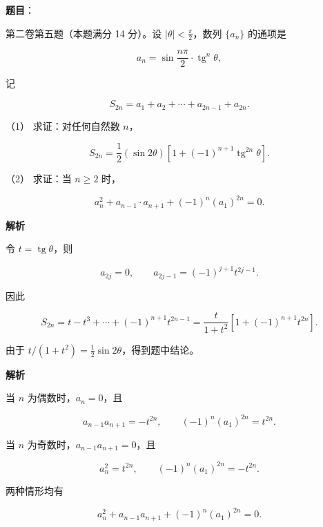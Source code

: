 \begin{answer}

\textbf{题目}：

第二卷第五题（本题满分 14 分）。设 $|\theta|<\frac\pi2$，数列 $\{a_n\}$ 的通项是

\nopagebreak[4]
\[
a_n=\sin\frac{n\pi}{2}\cdot\operatorname{tg}^n\theta,
\]

记

\nopagebreak[4]
\[
S_{2n}=a_1+a_2+\cdots+a_{2n-1}+a_{2n}.
\]

（1） 求证：对任何自然数 $n$，

\nopagebreak[4]
\[
S_{2n}=\frac12(\sin2\theta)
\left[1+(-1)^{n+1}\operatorname{tg}^{2n}\theta\right].
\]

（2） 求证：当 $n\ge2$ 时，

\nopagebreak[4]
\[
a_n^2+a_{n-1}\cdot a_{n+1}+(-1)^n(a_1)^{2n}=0.
\]

\textbf{解析}


令 $t=\operatorname{tg}\theta$，则

\nopagebreak[4]
\[
a_{2j}=0,\qquad a_{2j-1}=(-1)^{j+1}t^{2j-1}.
\]

因此

\nopagebreak[4]
\[
S_{2n}=t-t^3+\cdots+(-1)^{n+1}t^{2n-1}
=\frac{t}{1+t^2}\left[1+(-1)^{n+1}t^{2n}\right].
\]

由于 $t/(1+t^2)=\frac12\sin2\theta$，得到题中结论。


\textbf{解析}

当 $n$ 为偶数时，$a_n=0$，且

\nopagebreak[4]
\[
a_{n-1}a_{n+1}=-t^{2n},
\qquad
(-1)^n(a_1)^{2n}=t^{2n}.
\]

当 $n$ 为奇数时，$a_{n-1}a_{n+1}=0$，且

\nopagebreak[4]
\[
a_n^2=t^{2n},
\qquad
(-1)^n(a_1)^{2n}=-t^{2n}.
\]

两种情形均有

\nopagebreak[4]
\[
a_n^2+a_{n-1}a_{n+1}+(-1)^n(a_1)^{2n}=0.
\]



\end{answer}